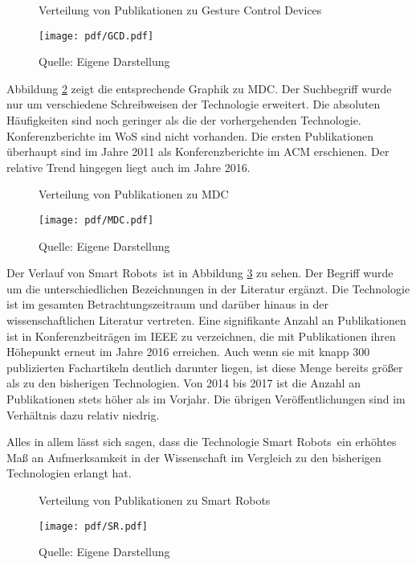 \begin{figure}
	\centering
	\caption{Verteilung von Publikationen zu \glqq Gesture Control Devices\grqq}
	\texttt{[image: pdf/GCD.pdf]}
	\caption*{Quelle: Eigene Darstellung}
	\label{fig:gcd_pub}
\end{figure}

Abbildung \ref{fig:mdc_pub} zeigt die entsprechende Graphik zu \glqq \acl{MDC}\grqq. Der Suchbegriff wurde nur um verschiedene Schreibweisen der Technologie erweitert. Die absoluten Häufigkeiten sind noch geringer als die der vorhergehenden Technologie. Konferenzberichte im \ac{WoS} sind nicht vorhanden. Die ersten Publikationen überhaupt sind im Jahre 2011 als Konferenzberichte im \ac{ACM} erschienen. Der relative Trend hingegen liegt auch im Jahre 2016.

\begin{figure}
	\centering
	\caption{Verteilung von Publikationen zu \glqq \acl{MDC}\grqq}
	\texttt{[image: pdf/MDC.pdf]}
	\caption*{Quelle: Eigene Darstellung}
	\label{fig:mdc_pub}
\end{figure}

Der Verlauf von \glqq Smart Robots\grqq~ist in Abbildung \ref{fig:sr_pub} zu sehen. Der Begriff wurde um die unterschiedlichen Bezeichnungen in der Literatur ergänzt. Die Technologie ist im gesamten Betrachtungszeitraum und darüber hinaus in der wissenschaftlichen Literatur vertreten. Eine signifikante Anzahl an Publikationen ist in Konferenzbeiträgen im \ac{IEEE} zu verzeichnen, die mit  Publikationen ihren Höhepunkt erneut im Jahre 2016 erreichen. Auch wenn sie mit knapp 300 publizierten Fachartikeln deutlich darunter liegen, ist diese Menge bereits größer als zu den bisherigen Technologien. Von 2014 bis 2017 ist die Anzahl an Publikationen stets höher als im Vorjahr. Die übrigen Veröffentlichungen sind im Verhältnis dazu relativ niedrig.

Alles in allem lässt sich sagen, dass die Technologie \glqq Smart Robots\grqq~ein erhöhtes Maß an Aufmerksamkeit in der Wissenschaft im Vergleich zu den bisherigen Technologien erlangt hat.

\begin{figure}
	\centering
	\caption{Verteilung von Publikationen zu \glqq Smart Robots\grqq}
	\texttt{[image: pdf/SR.pdf]}
	\caption*{Quelle: Eigene Darstellung}
	\label{fig:sr_pub}
\end{figure}

